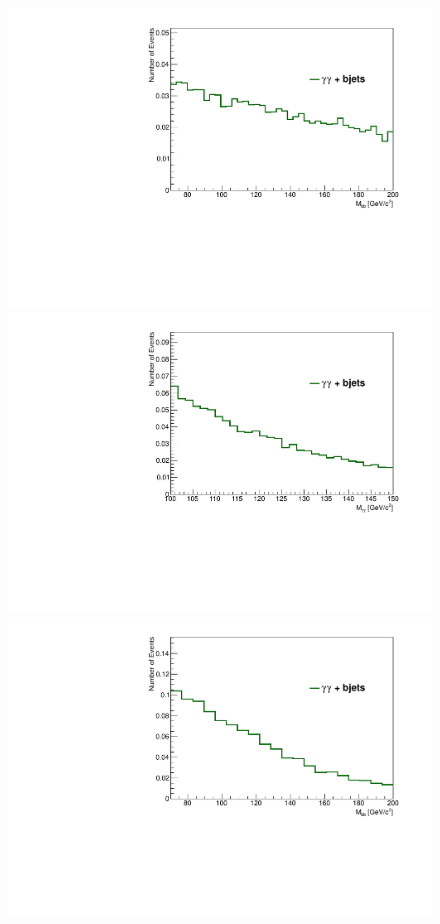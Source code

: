 \documentclass{cmspaper}
\begin{document}
\begin{figure}[h]
\centering
\includegraphics[scale=0.35, angle=0]{figures/MassBB_s0.pdf}	
\includegraphics[scale=0.35, angle=0]{figures/MassGG_s0.pdf}	
\includegraphics[scale=0.35, angle=0]{figures/MassBB_s1.pdf}	

\end{figure}
\end{document}
